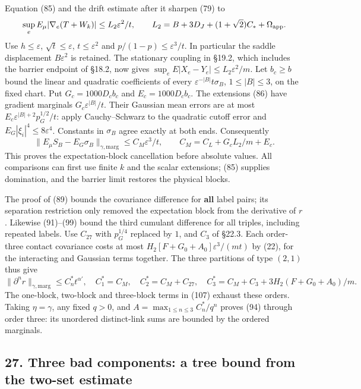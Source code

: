 \documentclass[11pt,a4paper]{article}
\begin{document}
Equation (85) and the drift estimate after it sharpen (79) to
\[\sup_e E_\mu|\nabla_e(T+W_k)|\le L_2\varepsilon^2/t,\qquad
L_2=B+3D_J+(1+\sqrt2)C_*+\Omega_{\rm app}.\] Use \(h\le\varepsilon\),
\(\sqrt t\le\varepsilon\), \(t\le\varepsilon^2\) and
\(p/(1-p)\le\varepsilon^3/t\). In particular the saddle displacement
\(B\varepsilon^2\) is retained. The stationary coupling in §19.2, which
includes the barrier endpoint of §18.2, now gives
\(\sup_e E|X_e-Y_e|\le L_2\varepsilon^2/m\). Let \(b_c\ge b\) bound the
linear and quadratic coefficients of every
\(\varepsilon^{-|B|}t\sigma_B\), \(1\le|B|\le3\), on the fixed chart.
Put \(G_c=1000D_cb_c\) and \(E_c=1000D_cb_c\). The extensions (86) have
gradient marginals \(G_c\varepsilon^{|B|}/t\). Their Gaussian mean
errors are at most \(E_c\varepsilon^{|B|+2}p_G^{1/2}/t\): apply
Cauchy--Schwarz to the quadratic cutoff error and
\(E_G|\xi_i|^4\le8\varepsilon^4\). Constants in \(\sigma_B\) agree
exactly at both ends. Consequently
\[\|E_\mu S_B-E_G\sigma_B\|_{\gamma,\mathrm{marg}}
\le C_M\varepsilon^3/t,\qquad
C_M=C_L+G_cL_2/m+E_c.\tag{118}\] This proves the expectation-block
cancellation before absolute values. All comparisons can first use
finite \(k\) and the scalar extensions; (85) supplies domination, and
the barrier limit restores the physical blocks.

The proof of (89) bounds the covariance difference for \textbf{all}
label pairs; its separation restriction only removed the expectation
block from the derivative of \(r\). Likewise (91)--(99) bound the third
cumulant difference for all triples, including repeated labels. Use
\(C_{27}\) with \(p_G^{1/4}\) replaced by \(1\), and \(C_3\) of §22.3.
Each order-three contact covariance costs at most
\(H_2[F+G_0+A_0]\varepsilon^3/(mt)\) by (22), for the interacting and
Gaussian terms together. The three partitions of type \((2,1)\) thus
give \[\|\partial^n r\|_{\gamma,\mathrm{marg}}\le C_n^*t^{\alpha'},\quad
C_1^*=C_M,\quad C_2^*=C_M+C_{27},\quad
C_3^*=C_M+C_3+3H_2(F+G_0+A_0)/m.\tag{119}\] The one-block, two-block and
three-block terms in (107) exhaust these orders. Taking \(\eta=\gamma\),
any fixed \(q>0\), and \(A=\max_{1\le n\le3}C_n^*/q^n\) proves (94)
through order three: its unordered distinct-link sums are bounded by the
ordered marginals.

\hypertarget{three-bad-components-a-tree-bound-from-the-two-set-estimate}{%
\subsection{27. Three bad components: a tree bound from the two-set
estimate}\label{three-bad-components-a-tree-bound-from-the-two-set-estimate}}
\end{document}
